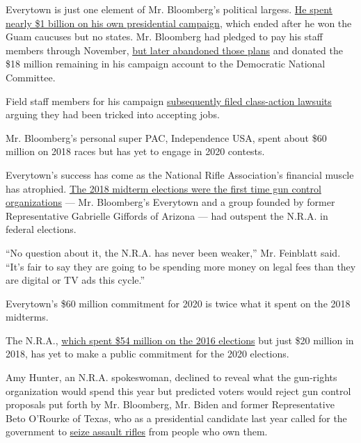 Everytown is just one element of Mr. Bloomberg's political largess.
\href{https://www.nytimes.com/2020/03/20/us/politics/bloomberg-campaign-900-million.html}{He
spent nearly \$1 billion on his own presidential campaign}, which ended
after he won the Guam caucuses but no states. Mr. Bloomberg had pledged
to pay his staff members through November,
\href{https://www.nytimes.com/2020/03/20/us/politics/michael-bloomberg-dnc.html}{but
later abandoned those plans} and donated the \$18 million remaining in
his campaign account to the Democratic National Committee.

Field staff members for his campaign
\href{https://www.nytimes.com/2020/03/23/us/politics/bloomberg-employee-lawsuit.html}{subsequently
filed class-action lawsuits} arguing they had been tricked into
accepting jobs.

Mr. Bloomberg's personal super PAC, Independence USA, spent about \$60
million on 2018 races but has yet to engage in 2020 contests.

Everytown's success has come as the National Rifle Association's
financial muscle has atrophied.
\href{https://www.wsj.com/articles/democrats-plan-to-pursue-most-aggressive-gun-control-legislation-in-decades-1541791440}{The
2018 midterm elections were the first time gun control organizations}
--- Mr. Bloomberg's Everytown and a group founded by former
Representative Gabrielle Giffords of Arizona --- had outspent the N.R.A.
in federal elections.

``No question about it, the N.R.A. has never been weaker,'' Mr.
Feinblatt said. ``It's fair to say they are going to be spending more
money on legal fees than they are digital or TV ads this cycle.''

Everytown's \$60 million commitment for 2020 is twice what it spent on
the 2018 midterms.

The N.R.A.,
\href{https://www.opensecrets.org/outsidespending/detail.php?cycle=2016\&cmte=National+Rifle+Assn}{which
spent \$54 million on the 2016 elections} but just \$20 million in 2018,
has yet to make a public commitment for the 2020 elections.

Amy Hunter, an N.R.A. spokeswoman, declined to reveal what the
gun-rights organization would spend this year but predicted voters would
reject gun control proposals put forth by Mr. Bloomberg, Mr. Biden and
former Representative Beto O'Rourke of Texas, who as a presidential
candidate last year called for the government to
\href{https://www.nytimes.com/2019/10/15/us/politics/beto-guns.html}{seize
assault rifles} from people who own them.

